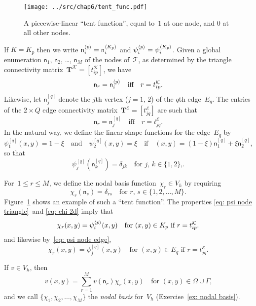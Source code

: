 \begin{figure}
\caption{A piecewise-linear ``tent function'', equal to~$1$ at one node, and 
$0$ at all other nodes.}\label{fig: tent func}
\begin{center}
\texttt{[image: ../src/chap6/tent\_func.pdf]}
\end{center}
\end{figure}

If $K=K_p$ then we write $\mathsf{n}_i^{\langle p\rangle}=\mathsf{n}_i^{\langle K_p\rangle}$ and
$\psi^{\langle p\rangle}_i=\psi^{\langle K_p\rangle}_i$.  Given a global enumeration $\mathsf{n}_1$,
$\mathsf{n}_2$, \dots, $\mathsf{n}_M$ of the nodes of~$\mathcal{T}$, as
determined by the triangle connectivity
matrix~$\boldsymbol{T}^{\mathcal{K}}=[t^{\mathcal{K}}_{ip}]$, we have
\[
\mathsf{n}_r=\mathsf{n}^{\langle p\rangle}_i\quad\text{iff}\quad r=t^{\mathcal{K}}_{ip}.
\]
Likewise, let $\mathsf{n}^{[q]}_j$ denote the $j$th vertex ($j=1$, $2$) of
the $q$th edge~$E_q$.  The entries of the $2\times Q$ edge connectivity
matrix~$\boldsymbol{T}^{\mathcal{E}}=[t^{\mathcal{E}}_{jq}]$ are such that
\[
\mathsf{n}_r=\mathsf{n}^{[q]}_j \quad\text{iff}\quad r=t^{\mathcal{E}}_{jq}.
\]
In the natural way, we define the linear shape functions for the edge~$E_q$ by
\[
\psi^{[q]}_1(x,y)=1-\xi\quad\text{and}\quad
\psi^{[q]}_2(x,y)=\xi\quad\text{if}\quad
(x,y)=(1-\xi)\mathsf{n}^{[q]}_1+\xi\mathsf{n}^{[q]}_2,
\]
so that
\begin{equation}\label{eq: psi node edge}
\psi^{[q]}_j(\mathsf{n}^{[q]}_k)=\delta_{jk}\quad\text{for $j$, $k\in\{1,2\}$,}.
\end{equation}

For~$1\le r\le M$, we define the nodal basis function~$\chi_r\in V_h$ by
requiring
\begin{equation}\label{eq: chi 2d}
\chi_r(\mathsf{n}_s)=\delta_{rs}\quad\text{for $r$, $s\in\{1, 2, \dots, M\}$.}
\end{equation}
Figure~\ref{fig: tent func} shows an example of such a ``tent function''.  
The properties \eqref{eq: psi node triangle}~and \eqref{eq: chi 2d} imply that
\begin{equation}\label{eq: chi psi}
\chi_r(x,y)=\psi^{\langle p\rangle}_i(x,y)
\quad\text{for $(x,y)\in K_p$ if $r=t^{\mathcal{K}}_{ip}$.}
\end{equation}
and likewise by~\eqref{eq: psi node edge},
\[
\chi_r(x,y)=\psi^{[q]}_j(x,y)
\quad\text{for $(x,y)\in E_q$ if $r=t^{\mathcal{E}}_{jq}$.}
\]

If $v\in V_h$, then
\[
v(x,y)=\sum_{r=1}^M v(\mathsf{n}_r)\chi_r(x,y)
	\quad\text{for $(x,y)\in\Omega\cup\Gamma$,}
\]
and we call $\{\chi_1,\chi_2,\ldots,\chi_M\}$ the \emph{nodal basis} for~$V_h$
(Exercise~\ref{ex: nodal basis}).

